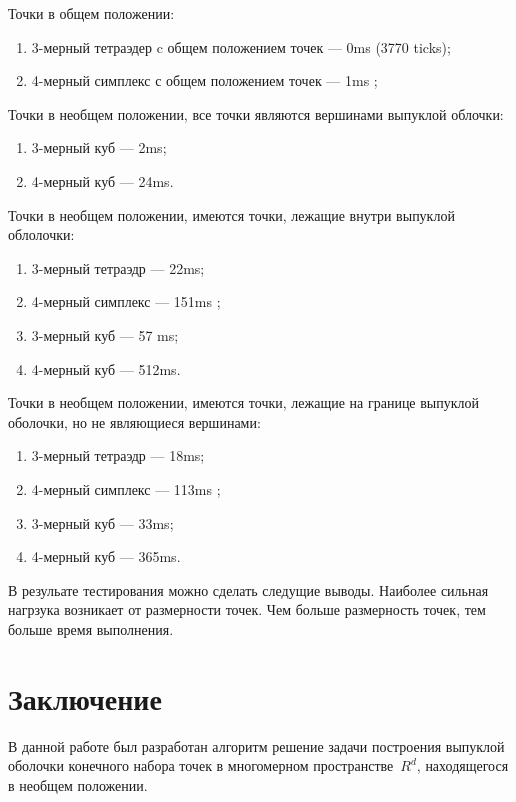\documentclass[14pt]{extarticle}
\begin{document}
Точки в общем положении:
\begin{enumerate}[topsep=-0.5\parsep,itemsep=-0.5\parsep]
  \item 3-мерный тетраэдер c общем положением точек --- 0ms (3770 ticks);
  \item 4-мерный симплекс с общем положением точек --- 1ms ;
\end{enumerate}
\medskip
Точки в необщем положении, все точки являются вершинами выпуклой облочки:
\begin{enumerate}[topsep=-0.5\parsep,itemsep=-0.5\parsep]
        \item 3-мерный куб  --- 2ms;
        \item 4-мерный куб --- 24ms.
\end{enumerate}
\medskip
Точки в необщем положении, имеются точки, лежащие внутри выпуклой облолочки:
\begin{enumerate}[topsep=-0.5\parsep,itemsep=-0.5\parsep]
        \item 3-мерный тетраэдр --- 22ms;
        \item 4-мерный симплекс  --- 151ms ;
        \item 3-мерный куб  --- 57 ms;
        \item 4-мерный куб --- 512ms.
\end{enumerate}
Точки в необщем положении, имеются точки, лежащие на границе выпуклой оболочки, но не являющиеся вершинами:
\begin{enumerate}[topsep=-0.5\parsep,itemsep=-0.5\parsep]
        \item 3-мерный тетраэдр --- 18ms;
        \item 4-мерный симплекс  --- 113ms ;
        \item 3-мерный куб  --- 33ms;
        \item 4-мерный куб --- 365ms.
\end{enumerate}
\medskip

В резульате тестирования можно сделать следущие выводы.
Наиболее сильная нагрзука возникает от размерности точек. Чем больше размерность точек, тем больше время выполнения.
\newpage


\section*{Заключение}
В данной работе был разработан алгоритм решение задачи построения выпуклой оболочки конечного набора точек в многомерном пространстве~$R^d$, находящегося в необщем положении.
\end{document}
